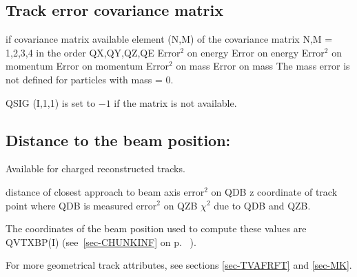 \subsection{\label{sec-TVATM}Track error covariance matrix}
\par
\begin{indentlist}{ 3.00cm}{ 3.25cm}
 if covariance matrix available
element (N,M) of the covariance matrix
N,M = 1,2,3,4 in the order QX,QY,QZ,QE
Error$^2$ on energy
Error on energy
Error$^2$ on momentum
Error on momentum
Error$^2$ on mass
Error on mass
The mass error is not defined for particles with mass = 0.
\end{indentlist}
QSIG (I,1,1) is set to  $-1$
if the matrix is not available.
 
\subsection{\label{sec-TVAD}Distance to the beam position:}
\par
Available for charged reconstructed tracks.
\begin{indentlist}{ 3.00cm}{ 3.25cm}
distance of closest approach to beam axis
error$^2$ on QDB
z coordinate of track point where QDB is measured
error$^2$ on QZB
$\chi^2$ due to QDB and QZB.
\end{indentlist}
The coordinates of the beam position used to compute these
values are QVTXBP(I)  (see~\ref{sec-CHUNKINF} on p. ~\pageref{sec-CHUNKINF}).

\par
For more geometrical track attributes, see sections \ref{sec-TVAFRFT}
and \ref{sec-MK}.
 
